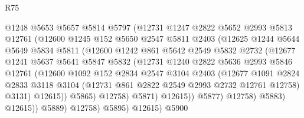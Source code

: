 \begin{lexlean}{R75}
\begin{coremodule}
                      @1248
                      @5653
                      @5657
                      @5814
                      @5797
                      (@12731
                        @1247
                        @2822
                        @5652
                        @2993
                        @5813
                        @12761
                        (@12600
                          @1245
                          @152
                          @5650
                          @2547
                          @5811
                          @2403
                          (@12625
                            @1244
                            @5644
                            @5649
                            @5834
                            @5811
                            (@12600
                              @1242
                              @861
                              @5642
                              @2549
                              @5832
                              @2732
                              (@12677
                                @1241
                                @5637
                                @5641
                                @5847
                                @5832
                                (@12731
                                  @1240
                                  @2822
                                  @5636
                                  @2993
                                  @5846
                                  @12761
                                  (@12600
                                    @1092
                                    @152
                                    @2834
                                    @2547
                                    @3104
                                    @2403
                                    (@12677
                                      @1091
                                      @2824
                                      @2833
                                      @3118
                                      @3104
                                      (@12731 @861 @2822 @2549 @2993 @2732 @12761 @12758)
                                      @3131)
                                    @12615))
                                @5865)
                              @12758)
                            @5871)
                          @12615))
                      @5877)
                    @12758)
                  @5883)
                @12615))
            @5889)
          @12758)
        @5895)
      @12615)
    @5900

\end{coremodule}
\end{lexlean}
